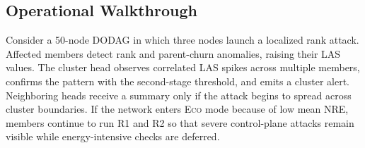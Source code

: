 \subsection{Operational Walkthrough}
Consider a 50-node DODAG in which three nodes launch a localized rank attack.
Affected members detect rank and parent-churn anomalies, raising their LAS values.
The cluster head observes correlated LAS spikes across multiple members, confirms the pattern with the second-stage threshold, and emits a cluster alert.
Neighboring heads receive a summary only if the attack begins to spread across cluster boundaries.
If the network enters \textsc{Eco} mode because of low mean NRE, members continue to run R1 and R2 so that severe control-plane attacks remain visible while energy-intensive checks are deferred.
